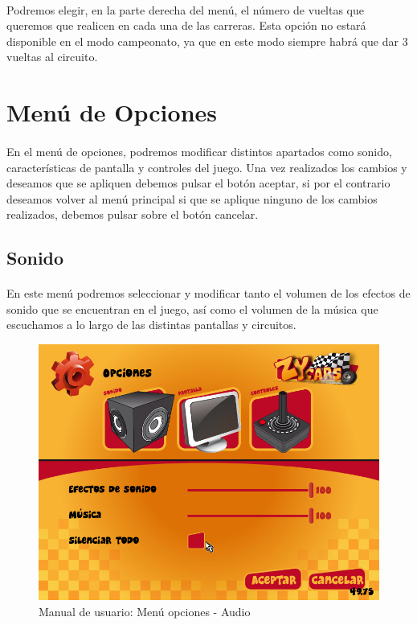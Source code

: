 \paragraph{}
Podremos elegir, en la parte derecha del menú, el número de vueltas que queremos que realicen en cada una de las carreras. Esta opción
no estará disponible en el modo campeonato, ya que en este modo siempre habrá que dar 3 vueltas al circuito.

\section{Menú de Opciones}

\paragraph{}
En el menú de opciones, podremos modificar distintos apartados como sonido, características de pantalla y controles del juego. 
Una vez realizados los cambios y deseamos que se apliquen debemos pulsar el botón aceptar, si por el contrario deseamos volver al
menú principal si que se aplique ninguno de los cambios realizados, debemos pulsar sobre el botón cancelar.

\subsection{Sonido}

\paragraph{}
En este menú podremos seleccionar y modificar tanto el volumen de los efectos de sonido que se encuentran en el juego, así 
como el volumen de la música que escuchamos a lo largo de las distintas pantallas y circuitos.

\begin{figure}[H]
  \label{menu_audio}
  \begin{center}
    \includegraphics[scale=0.4]{imagenes/capturas/menuopcionesaudio.png}
  \end{center}
 \caption{Manual de usuario: Menú opciones - Audio}
\end{figure}

